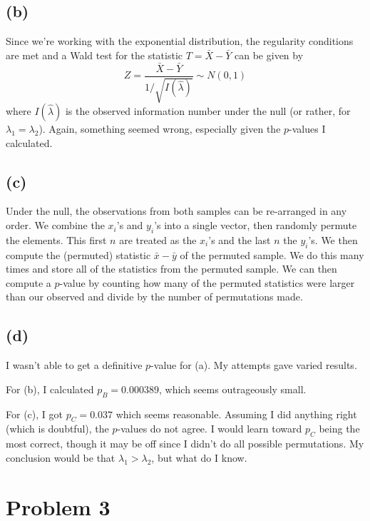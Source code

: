\documentclass[12pt]{article}
\begin{document}
\subsection*{(b)}

\noindent Since we're working with the exponential distribution, the regularity conditions are met and a Wald test for the statistic $T=\bar X - \bar Y$ can be given by
\[ Z = \frac{\bar X - \bar Y}{1/\sqrt{I(\hat\lambda)}} \sim N(0,1) \]
\noindent where $I(\hat\lambda)$ is the observed information number under the null (or rather, for $\lambda_1=\lambda_2$). Again, something seemed wrong, especially given the $p$-values I calculated.

\subsection*{(c)}

\noindent Under the null, the observations from both samples can be re-arranged in any order. We combine the $x_i$'s and $y_i$'s into a single vector, then randomly permute the elements. This first $n$ are treated as the $x_i$'s and the last $n$ the $y_i$'s.  We then compute the (permuted) statistic $\bar x - \bar y$ of the permuted sample. We do this many times and store all of the statistics from the permuted sample. We can then compute a $p$-value by counting how many of the permuted statistics were larger than our observed and divide by the number of permutations made.

\subsection*{(d)}

\noindent I wasn't able to get a definitive $p$-value for (a). My attempts gave varied results.
\bigskip

\noindent For (b), I calculated $p_B=0.000389$, which seems outrageously small.
\bigskip

\noindent For (c), I got $p_C=0.037$ which seems reasonable. Assuming I did anything right (which is doubtful), the $p$-values do not agree. I would learn toward $p_C$ being the most correct, though it may be off since I didn't do all possible permutations. My conclusion would be that $\lambda_1>\lambda_2$, but what do I know.


\section*{Problem 3}
\end{document}
